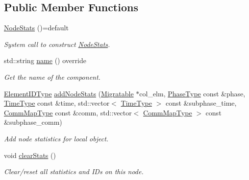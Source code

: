 \subsection*{Public Member Functions}
\begin{DoxyCompactItemize}
\item 
\hyperlink{structvt_1_1vrt_1_1collection_1_1balance_1_1_node_stats_a05936543d7f0f41a55c77fe5265ca8ed}{Node\+Stats} ()=default
\begin{DoxyCompactList}\small\item\em System call to construct {\ttfamily \hyperlink{structvt_1_1vrt_1_1collection_1_1balance_1_1_node_stats}{Node\+Stats}}. \end{DoxyCompactList}\item 
std\+::string \hyperlink{structvt_1_1vrt_1_1collection_1_1balance_1_1_node_stats_adfd9b278e017ccc02ed418c8f46bea2c}{name} () override
\begin{DoxyCompactList}\small\item\em Get the name of the component. \end{DoxyCompactList}\item 
\hyperlink{namespacevt_1_1vrt_1_1collection_1_1balance_a14c8d2c972f2913aa3f1636e5be0a120}{Element\+I\+D\+Type} \hyperlink{structvt_1_1vrt_1_1collection_1_1balance_1_1_node_stats_a8bf0798c086f7e9c28b81463672f31d8}{add\+Node\+Stats} (\hyperlink{structvt_1_1vrt_1_1collection_1_1_migratable}{Migratable} $\ast$col\+\_\+elm, \hyperlink{namespacevt_a46ce6733d5cdbd735d561b7b4029f6d7}{Phase\+Type} const \&phase, \hyperlink{namespacevt_a876a9d0cd5a952859c72de8a46881442}{Time\+Type} const \&time, std\+::vector$<$ \hyperlink{namespacevt_a876a9d0cd5a952859c72de8a46881442}{Time\+Type} $>$ const \&subphase\+\_\+time, \hyperlink{namespacevt_1_1vrt_1_1collection_1_1balance_a10860c956804d644db54a16012352728}{Comm\+Map\+Type} const \&comm, std\+::vector$<$ \hyperlink{namespacevt_1_1vrt_1_1collection_1_1balance_a10860c956804d644db54a16012352728}{Comm\+Map\+Type} $>$ const \&subphase\+\_\+comm)
\begin{DoxyCompactList}\small\item\em Add node statistics for local object. \end{DoxyCompactList}\item 
void \hyperlink{structvt_1_1vrt_1_1collection_1_1balance_1_1_node_stats_a99adbf5c5165b274dd5abd761ed72c45}{clear\+Stats} ()
\begin{DoxyCompactList}\small\item\em Clear/reset all statistics and I\+Ds on this node. \end{DoxyCompactList}\item 

\end{DoxyCompactItemize}

